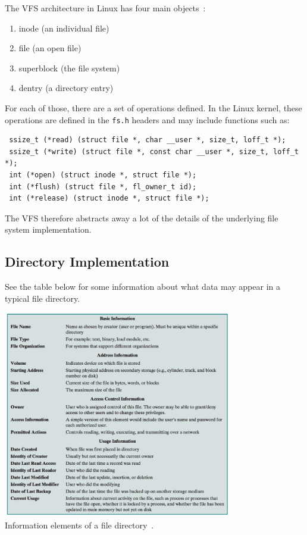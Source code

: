 The VFS architecture in Linux has four main objects~\cite{osc}:
\begin{enumerate}
	\item inode (an individual file)
	\item file (an open file)
	\item superblock (the file system)
	\item dentry (a directory entry)
\end{enumerate}

For each of those, there are a set of operations defined. In the Linux kernel, these operations are defined in the \texttt{fs.h} headers and may include functions such as:

\begin{verbatim}
 ssize_t (*read) (struct file *, char __user *, size_t, loff_t *);
 ssize_t (*write) (struct file *, const char __user *, size_t, loff_t *);
 int (*open) (struct inode *, struct file *);
 int (*flush) (struct file *, fl_owner_t id);
 int (*release) (struct inode *, struct file *);
\end{verbatim}

The VFS therefore abstracts away a lot of the details of the underlying file system implementation.

\subsection*{Directory Implementation} 

See the table below for some information about what data may appear in a typical file directory.

\begin{center}
	\includegraphics[width=0.75\textwidth]{images/directory.png}\\
	Information elements of a file directory~\cite{osi}.
\end{center}

